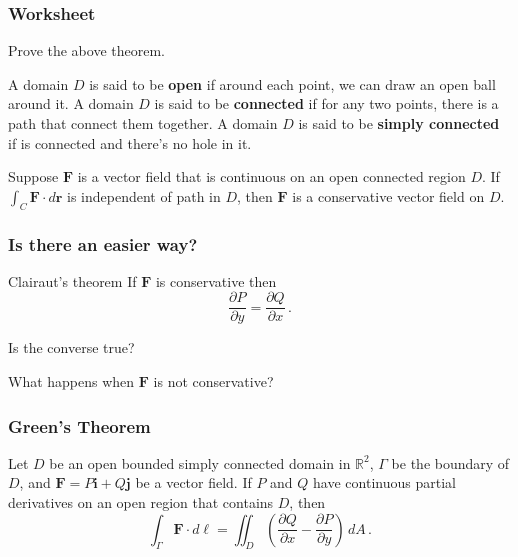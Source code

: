 \documentclass[aspectratio=169]{beamer}
\newcommand{\vect}{\mathbf}
\begin{document}
\begin{frame}
    \frametitle{Worksheet}
    Prove the above theorem.
\end{frame}

\begin{frame}
\begin{definition}
A domain \(D\) is said to be \textbf{open} if around each point, we can draw an open ball around it.
A domain \(D\) is said to be \textbf{connected} if for any two points, there is a path that connect them
together.
A domain \(D\) is said to be \textbf{simply connected} if is connected and there's no hole in it.
\end{definition}
\end{frame}


\begin{frame}
\begin{theorem}
Suppose \(\mathbf{F}\) is a vector field that is continuous on an open
connected region \(D\).
If \(\int_C \mathbf{F} \cdot d \mathbf{r}\) is independent of path in \(D\),
then \(\mathbf{F}\) is a conservative vector field on \(D\).
\end{theorem}
\end{frame}

\begin{frame}
    \frametitle{Is there an easier way?}
    \pause
    Clairaut's theorem
    If $\vect{F}$ is conservative then
    \begin{equation*}
        \frac{\partial P}{\partial y} = \frac{\partial Q}{\partial x} \,.
    \end{equation*}

    \pause

    Is the converse true?
\end{frame}

\begin{frame}
    What happens when $\vect{F}$ is not conservative?
\end{frame}

\begin{frame}
    \frametitle{Green's Theorem}
\begin{theorem}
Let \(D\) be an open bounded simply connected domain in \(\mathbb{R}^2\),
\(\Gamma\) be the boundary of \(D\),
and \(\mathbf{F} = P\mathbf{i} + Q \mathbf{j}\) be a vector field.
If \(P\) and \(Q\) have continuous partial derivatives on an open region
that contains \(D\), then
\begin{equation*}
    \int_\Gamma \mathbf{F} \cdot d \ell  = \iint_D \left( \frac{\partial Q}{\partial x} - \frac{\partial P}{\partial y} \right) \, dA \,.
\end{equation*}
\end{theorem}
\end{frame}
\end{document}
